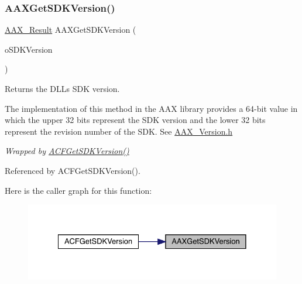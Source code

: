 \subsubsection{\texorpdfstring{AAXGetSDKVersion()}{AAXGetSDKVersion()}}
{\footnotesize\ttfamily \mbox{\hyperlink{a00392_a4d8f69a697df7f70c3a8e9b8ee130d2f}{A\+A\+X\+\_\+\+Result}} A\+A\+X\+Get\+S\+D\+K\+Version (\begin{DoxyParamCaption}\item[{acf\+U\+Int64 $\ast$}]{o\+S\+D\+K\+Version }\end{DoxyParamCaption})}



Returns the D\+LL\textquotesingle{}s S\+DK version. 

The implementation of this method in the A\+AX library provides a 64-\/bit value in which the upper 32 bits represent the S\+DK version and the lower 32 bits represent the revision number of the S\+DK. See \mbox{\hyperlink{a00707}{A\+A\+X\+\_\+\+Version.\+h}}

{\itshape Wrapped by \mbox{\hyperlink{a00500_a2a47c5f7e29baf716a4c4956389e83c9}{A\+C\+F\+Get\+S\+D\+K\+Version()}} } 

Referenced by A\+C\+F\+Get\+S\+D\+K\+Version().

Here is the caller graph for this function\+:
\nopagebreak
\begin{figure}[H]
\begin{center}
\leavevmode
\includegraphics[width=328pt]{a00617_a6a9bb35afab5850f43b0f8f9ce2df6ef_icgraph}
\end{center}
\end{figure}
